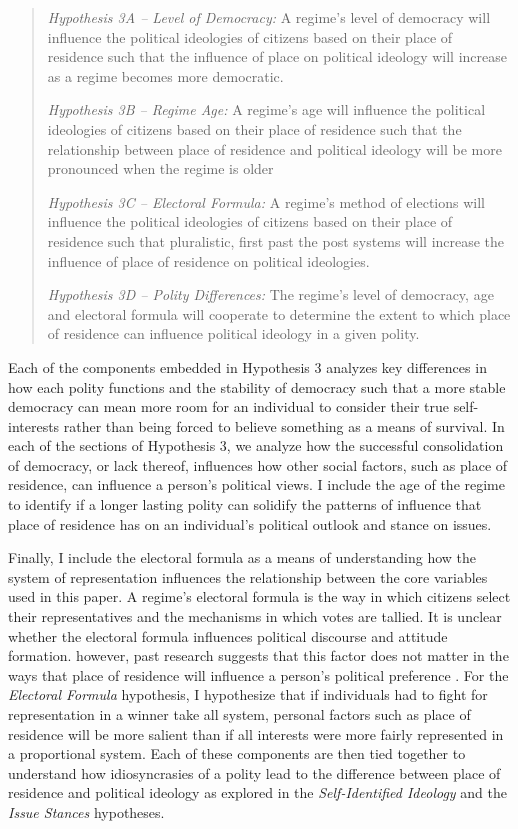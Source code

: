 \documentclass[12pt, titlepage]{article}
\newcommand\e{\emph}
\begin{document}
\begin{quote}
	\e{Hypothesis 3A -- Level of Democracy:} A regime's level of democracy will influence the political ideologies of citizens based on their place of residence such that the influence of place on political ideology will increase as a regime becomes more democratic. 
	
	\e{Hypothesis 3B -- Regime Age:} A regime's age will influence the political ideologies of citizens based on their place of residence such that the relationship between place of residence and political ideology will be more pronounced when the regime is older
	
	\e{Hypothesis 3C -- Electoral Formula:} A regime's method of elections will influence the political ideologies of citizens based on their place of residence such that pluralistic, first past the post systems will increase the influence of place of residence on political ideologies.
	
	\e{Hypothesis 3D -- Polity Differences:} The regime's level of democracy, age and electoral formula will cooperate to determine the extent to which place of residence can influence political ideology in a given polity.
\end{quote}

Each of the components embedded in Hypothesis 3 analyzes key differences in how each polity functions and the stability of democracy such that a more stable democracy can mean more room for an individual to consider their true self-interests rather than being forced to believe something as a means of survival. In each of the sections of Hypothesis 3, we analyze how the successful consolidation of democracy, or lack thereof, influences how other social factors, such as place of residence, can influence a person's political views. I include the age of the regime to identify if a longer lasting polity can solidify the patterns of influence that place of residence has on an individual's political outlook and stance on issues. 

Finally, I include the electoral formula as a means of understanding how the system of representation influences the relationship between the core variables used in this paper. A regime's electoral formula is the way in which citizens select their representatives and the mechanisms in which votes are tallied. It is unclear whether the electoral formula influences political discourse and attitude formation. however, past research suggests that this factor does not matter in the ways that place of residence will influence a person's political preference \citep{barkan_space_2006}. For the \e{Electoral Formula} hypothesis, I hypothesize that if individuals had to fight for representation in a winner take all system, personal factors such as place of residence will be more salient than if all interests were more fairly represented in a proportional system. Each of these components are then tied together to understand how idiosyncrasies of a polity lead to the difference between place of residence and political ideology as explored in the \e{Self-Identified Ideology} and the \e{Issue Stances} hypotheses.
\end{document}
